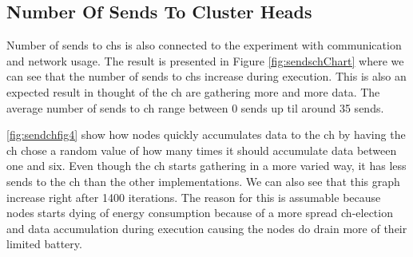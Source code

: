 \documentclass[USenglish]{uit-thesis}
\begin{document}




\newpage

\subsection{Number Of Sends To Cluster Heads}
Number of sends to \glspl{ch} is also connected to the experiment with communication and network usage. The result is presented in Figure \ref{fig:sendschChart} where we can see that the number of sends to \glspl{ch} increase during execution. This is also an expected result in thought of the \gls{ch} are gathering more and more data. The average number of sends to \gls{ch} range between $0$ sends up til around 35 sends.

\autoref{fig:sendchfig4} show how nodes quickly accumulates data to the \gls{ch} by having the \gls{ch} chose a random value of how many times it should accumulate data between one and six. Even though the \gls{ch} starts gathering in a more varied way, it has less sends to the \gls{ch} than the other implementations. We can also see that this graph increase right after 1400 iterations. The reason for this is assumable because nodes starts dying of energy consumption because of a more spread \gls{ch}-election and data accumulation during execution causing the nodes do drain more of their limited battery.


\end{document}
